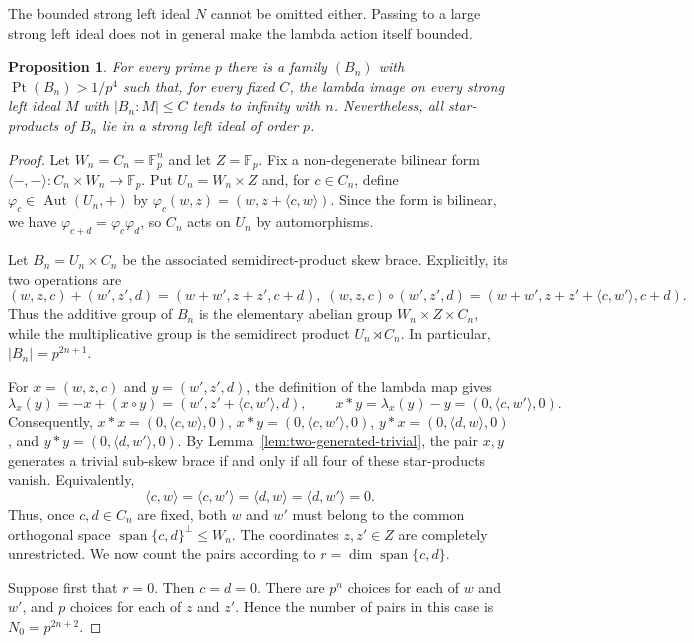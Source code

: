 \documentclass[11pt, oneside]{amsart}
\numberwithin{equation}{section}
\theoremstyle{plain}
\newtheorem{pro}[equation]{Proposition}
\theoremstyle{definition}
\newcommand{\Pt}{\operatorname{Pt} }
\newcommand{\Aut}{\operatorname{Aut} }
\begin{document}
The bounded strong left ideal $N$ cannot be omitted either. Passing to
a large strong left ideal does not in general make the lambda action
itself bounded.

\begin{pro} %
For every prime $p$ there is a family $(B_n)$ with
$\Pt(B_n)>1/p^4$ such that, for every fixed $C$, the lambda image on
every strong left ideal $M$ with $|B_n:M|\leqslant C$ tends to infinity
with $n$. Nevertheless, all star-products of $B_n$ lie in a strong
left ideal of order $p$.
\end{pro}
\begin{proof}
Let $W_n=C_n=\mathbb F_p^n$ and let $Z=\mathbb F_p$. Fix a non-degenerate bilinear form
$\langle-,-\rangle:C_n\times W_n\to\mathbb F_p$. Put $U_n=W_n\times Z$ and, for $c\in C_n$, define
$\varphi_c\in\Aut(U_n,+)$ by
$\varphi_c(w,z)=(w,z+\langle c,w\rangle)$. Since the form is bilinear, we have
$\varphi_{c+d}=\varphi_c\varphi_d$, so $C_n$ acts on $U_n$ by automorphisms.

Let $B_n=U_n\times C_n$ be the associated semidirect-product skew brace. Explicitly, its two operations are
$$
(w,z,c)+(w',z',d)=(w+w',z+z',c+d),\;
(w,z,c)\circ(w',z',d)
=(w+w',z+z'+\langle c,w'\rangle,c+d).
$$
Thus the additive group of $B_n$ is the elementary abelian group
$W_n\times Z\times C_n$, while the multiplicative group is the semidirect product
$U_n\rtimes C_n$. In particular,
$|B_n|=p^{2n+1}$.

For $x=(w,z,c)$ and $y=(w',z',d)$, the definition of the lambda map gives
$$
\lambda_x(y)
=-x+(x\circ y)
=(w',z'+\langle c,w'\rangle,d),
\qquad
x*y=\lambda_x(y)-y=(0,\langle c,w'\rangle,0).
$$
Consequently,
$x*x=(0,\langle c,w\rangle,0)$,
$x*y=(0,\langle c,w'\rangle,0)$,
$y*x=(0,\langle d,w\rangle,0)$, and
$y*y=(0,\langle d,w'\rangle,0)$.
By Lemma~\ref{lem:two-generated-trivial}, the pair $x,y$ generates a trivial sub-skew brace if and only if all four of these star-products vanish. Equivalently,
$$
\langle c,w\rangle=\langle c,w'\rangle
=\langle d,w\rangle=\langle d,w'\rangle=0.
$$
Thus, once $c,d\in C_n$ are fixed, both $w$ and $w'$ must belong to the common orthogonal space
$\operatorname{span}\{c,d\}^{\perp}\leqslant W_n$. The coordinates $z,z'\in Z$ are completely unrestricted. We now count the pairs according to
$r=\dim\operatorname{span}\{c,d\}$.

Suppose first that $r=0$. Then $c=d=0$. There are $p^n$ choices for each of $w$ and $w'$, and $p$ choices for each of $z$ and $z'$. Hence the number of pairs in this case is
$N_0=p^{2n+2}$.


\end{proof}
\end{document}
